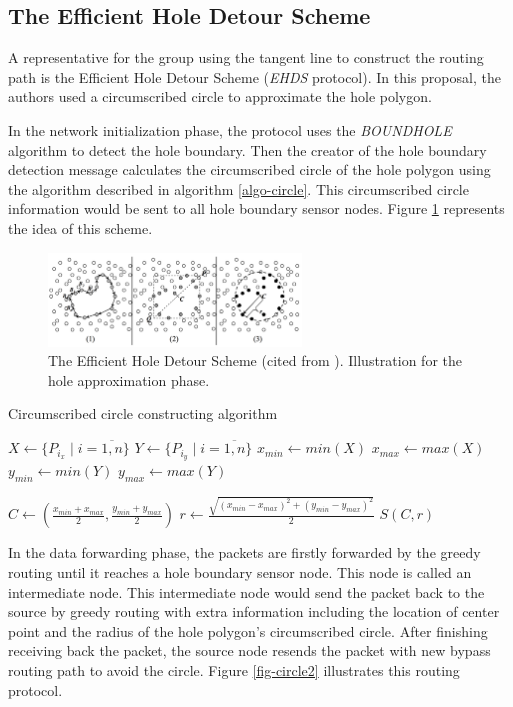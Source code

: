 \subsection{The Efficient Hole Detour Scheme}
A representative for the group using the tangent line to construct the routing path is the Efficient Hole Detour Scheme (\emph{EHDS} protocol). In this proposal, the authors used a circumscribed circle to approximate the hole polygon.

In the network initialization phase, the protocol uses the \emph{BOUNDHOLE} algorithm to detect the hole boundary. Then the creator of the hole boundary detection message calculates the circumscribed circle of the hole polygon using the algorithm described in algorithm \ref{algo-circle}. This circumscribed circle information would be sent to all hole boundary sensor nodes. Figure \ref{fig-circle} represents the idea of this scheme. 

\begin{figure}[!htb]
\centering
\includegraphics[width=0.6\textwidth]{Chapter3/Chapter3Figs/fig-circle.png}
\caption{The Efficient Hole Detour Scheme (cited from \cite{ehds}). Illustration for the hole approximation phase.}
\label{fig-circle}
\end{figure}

\begin{algorithm}[!htb]
\SetAlgoLined
\caption{Circumscribed circle constructing algorithm}
\label{algo-circle}

$X \leftarrow \{P_{i_x} \mid i = \overline{1,n}\}$\;
$Y \leftarrow \{P_{i_y} \mid i = \overline{1,n}\}$\;
$x_{min} \leftarrow min(X)$ \;
$x_{max} \leftarrow max(X)$ \;
$y_{min} \leftarrow min(Y)$ \;
$y_{max} \leftarrow max(Y)$ \;

$C \leftarrow (\frac{x_{min} + x_{max}}{2}, \frac{y_{min} + y_{max}}{2})$\;
$r \leftarrow \frac{\sqrt{(x_{min} - x_{max})^{2} + (y_{min} - y_{max})^{2}}}{2}$\;
\Return $S(C,r)$\;
\end{algorithm}

In the data forwarding phase, the packets are firstly forwarded by the greedy routing until it reaches a hole boundary sensor node. This node is called an intermediate node. This intermediate node would send the packet back to the source by greedy routing with extra information including the location of center point and the radius of the hole polygon's circumscribed circle. After finishing receiving back the packet, the source node resends the packet with new bypass routing path to avoid the circle. Figure \ref{fig-circle2} illustrates this routing protocol.

